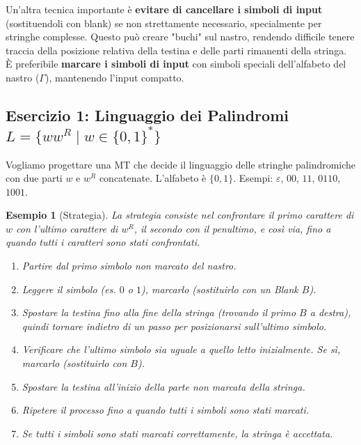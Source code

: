 \documentclass[a4paper, 11pt]{book} %
\newtheorem{example}[theorem]{Esempio}
\theoremstyle{definition}
\begin{document}
Un'altra tecnica importante è \textbf{evitare di cancellare i simboli di input} (sostituendoli con blank) se non strettamente necessario, specialmente per stringhe complesse. Questo può creare "buchi" sul nastro, rendendo difficile tenere traccia della posizione relativa della testina e delle parti rimanenti della stringa. È preferibile \textbf{marcare i simboli di input} con simboli speciali dell'alfabeto del nastro ($\Gamma$), mantenendo l'input compatto.

\subsection{Esercizio 1: Linguaggio dei Palindromi $L = \{ww^R \mid w \in \{0,1\}^*\}$}

Vogliamo progettare una MT che decide il linguaggio delle stringhe palindromiche con due parti $w$ e $w^R$ concatenate. L'alfabeto è $\{0,1\}$. Esempi: $\varepsilon$, $00$, $11$, $0110$, $1001$.

\begin{example}[Strategia]
La strategia consiste nel confrontare il primo carattere di $w$ con l'ultimo carattere di $w^R$, il secondo con il penultimo, e così via, fino a quando tutti i caratteri sono stati confrontati.
\begin{enumerate}
    \item Partire dal primo simbolo non marcato del nastro.
    \item Leggere il simbolo (es. $0$ o $1$), marcarlo (sostituirlo con un Blank $B$).
    \item Spostare la testina fino alla fine della stringa (trovando il primo $B$ a destra), quindi tornare indietro di un passo per posizionarsi sull'ultimo simbolo.
    \item Verificare che l'ultimo simbolo sia uguale a quello letto inizialmente. Se sì, marcarlo (sostituirlo con $B$).
    \item Spostare la testina all'inizio della parte non marcata della stringa.
    \item Ripetere il processo fino a quando tutti i simboli sono stati marcati.
    \item Se tutti i simboli sono stati marcati correttamente, la stringa è accettata.
\end{enumerate}
\end{example}
\end{document}
